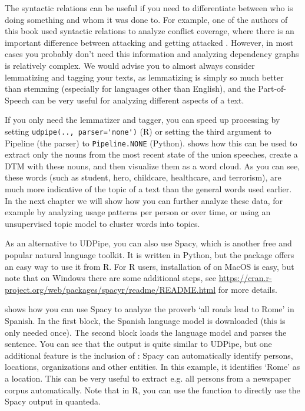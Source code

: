 
The syntactic relations can be useful if you need to differentiate between who is doing something and whom it was done to.
For example, one of the authors of this book used syntactic relations to analyze conflict coverage,
where there is an important difference between attacking and getting attacked \citep{clause}.
However, in most cases you probably don't need this information and analyzing dependency graphs is relatively complex.
We would advise you to almost always consider lemmatizing and tagging your texts, as lemmatizing is simply so much better than stemming
(especially for languages other than English), and the Part-of-Speech can be very useful for analyzing different aspects of a text. 

If you only need the lemmatizer and tagger, you can speed up processing by setting \verb|udpipe(.., parser='none')| (R) or setting the third argument to Pipeline (the parser) to \verb|Pipeline.NONE| (Python).
 shows how this can be used to extract only the nouns from the most recent state of the union speeches,
create a DTM with these nouns, and then visualize them as a word cloud.
As you can see, these words (such as student, hero, childcare, healthcare, and terrorism), are much more indicative of the topic of a text than the general words used earlier.
In the next chapter we will show how you can further analyze these data, for example by analyzing usage patterns per person or over time, or using an unsupervised topic model to cluster words into topics.


As an alternative to UDPipe, you can also use Spacy,
which is another free and popular natural language toolkit.
It is written in Python, but the  package offers an easy way to use it from R.
For R users, installation of  on MacOS is easy,
but note that on Windows there are some additional steps, see
\url{https://cran.r-project.org/web/packages/spacyr/readme/README.html} for more details.

 shows how you can use Spacy to analyze the proverb `all roads lead to Rome' in Spanish.
In the first block, the Spanish language model is downloaded (this is only needed once).
The second block loads the language model and parses the sentence.
You can see that the output is quite similar to UDPipe, but one additional feature is the inclusion of
:
Spacy can automatically identify persons, locations, organizations and other entities.
In this example, it identifies `Rome' as a location. 
This can be very useful to extract e.g. all persons from a newspaper corpus automatically.
Note that in R, you can use the  function  to directly use the Spacy output in quanteda.

